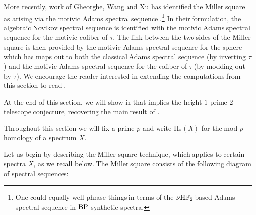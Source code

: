 \begin{rmk}
  More recently, work of Gheorghe, Wang and Xu has identified the Miller square as arising via the motivic Adams spectral sequence \cite{GWX}.\footnote{One could equally well phrase things in terms of the $\nu \mathrm{H}\mathbb{F}_2$-based Adams spectral sequence in $\mathrm{BP}$-synthetic spectra.} In their formulation, the algebraic Novikov spectral sequence is identified with the motivic Adams spectral sequence for the motivic cofiber of $\tau$.
  The link between the two sides of the Miller square is then provided by the motivic Adams spectral sequence for the sphere which has maps out to both the classical Adams spectral sequence (by inverting $\tau$) and the motivic Adams spectral sequence for the cofiber of $\tau$ (by modding out by $\tau$).
  We encourage the reader interested in extending the computations from this section to read \cite{GWX}.
\end{rmk}

\begin{rmk}
  At the end of this section, we will show in  that  implies the height $1$ prime $2$ telescope conjecture, recovering the main result of \cite{MahJEHP}.
\end{rmk}

\begin{ntn}
  Throughout this section we will fix a prime $p$ and write $\mathrm{H}_* (X)$ for the mod $p$ homology of a spectrum $X$.
\end{ntn}

%

Let us begin by describing the Miller square technique, which applies to certain spectra $X$, as we recall below. The Miller square consists of the following diagram of spectral sequences:
%

